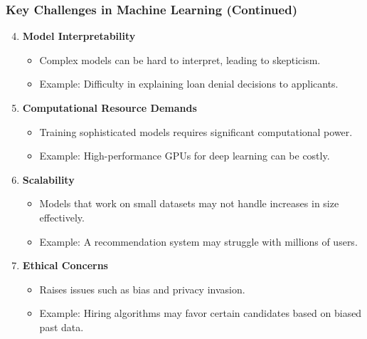 \documentclass{beamer}
\begin{document}
\begin{frame}[fragile]
    \frametitle{Key Challenges in Machine Learning (Continued)}

    \begin{enumerate}
        \setcounter{enumi}{3} %
        
        \item \textbf{Model Interpretability}
        \begin{itemize}
            \item Complex models can be hard to interpret, leading to skepticism.
            \item Example: Difficulty in explaining loan denial decisions to applicants.
        \end{itemize}
        
        \item \textbf{Computational Resource Demands}
        \begin{itemize}
            \item Training sophisticated models requires significant computational power.
            \item Example: High-performance GPUs for deep learning can be costly.
        \end{itemize}
        
        \item \textbf{Scalability}
        \begin{itemize}
            \item Models that work on small datasets may not handle increases in size effectively.
            \item Example: A recommendation system may struggle with millions of users.
        \end{itemize}
        
        \item \textbf{Ethical Concerns}
        \begin{itemize}
            \item Raises issues such as bias and privacy invasion.
            \item Example: Hiring algorithms may favor certain candidates based on biased past data.
        \end{itemize}
    \end{enumerate}
\end{frame}
\end{document}
